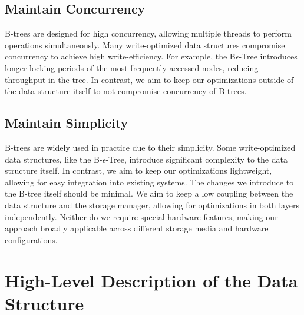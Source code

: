 \subsection*{Maintain Concurrency}
B-trees are designed for high concurrency, allowing multiple threads to perform operations simultaneously.
Many write-optimized data structures compromise concurrency to achieve high write-efficiency.
For example, the B$\epsilon$-Tree introduces longer locking periods of the most frequently accessed nodes, reducing throughput in the tree.
In contrast, we aim to keep our optimizations outside of the data structure itself to not compromise concurrency of B-trees.

\subsection*{Maintain Simplicity}
B-trees are widely used in practice due to their simplicity.
Some write-optimized data structures, like the B-$\epsilon$-Tree, introduce significant complexity to the data structure itself.
In contrast, we aim to keep our optimizations lightweight, allowing for easy integration into existing systems.
The changes we introduce to the B-tree itself should be minimal.
We aim to keep a low coupling between the data structure and the storage manager, allowing for optimizations in both layers independently.
Neither do we require special hardware features, making our approach broadly applicable across different storage media and hardware configurations.



\section{High-Level Description of the Data Structure}

